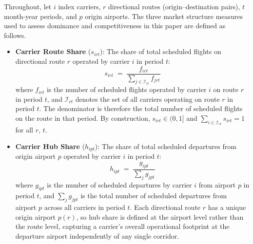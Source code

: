 \documentclass[preprint,12pt,authoryear]{elsarticle}
\begin{document}
Throughout, let $i$ index carriers, $r$ directional routes
(origin--destination pairs), $t$ month-year periods, and
$p$ origin airports. The three market structure measures used to assess dominance and competitiveness in this paper are defined as follows.

\begin{itemize}

    \item \textbf{Carrier Route Share} ($s_{irt}$): The share
    of total scheduled flights on directional route $r$ operated
    by carrier $i$ in period $t$:
    \begin{equation} \label{eq:route_share}
        s_{irt}
        \;=\;
        \frac{f_{irt}}{\displaystyle\sum_{j \in \mathcal{I}_{rt}} f_{jrt}}
    \end{equation}
    where $f_{irt}$ is the number of scheduled flights operated
    by carrier $i$ on route $r$ in period $t$, and
    $\mathcal{I}_{rt}$ denotes the set of all carriers operating
    on route $r$ in period $t$. The denominator is therefore the
    total number of scheduled flights on the route in that period.
    By construction, $s_{irt} \in (0, 1]$ and
    $\sum_{i \in \mathcal{I}_{rt}} s_{irt} = 1$ for all $r$, $t$.

    \item \textbf{Carrier Hub Share} ($h_{ipt}$): The share of
    total scheduled departures from origin airport $p$ operated
    by carrier $i$ in period $t$:
    \begin{equation} \label{eq:hub_share}
        h_{ipt}
        \;=\;
        \frac{g_{ipt}}{\displaystyle\sum_{j} g_{jpt}}
    \end{equation}
    where $g_{ipt}$ is the number of scheduled departures by
    carrier $i$ from airport $p$ in period $t$, and
    $\sum_{j} g_{jpt}$ is the total number of scheduled
    departures from airport $p$ across all carriers in period
    $t$. Each directional route $r$ has a unique origin airport
    $p(r)$, so hub share is defined at the airport level rather
    than the route level, capturing a carrier's overall
    operational footprint at the departure airport independently
    of any single corridor.


\end{itemize}
\end{document}
